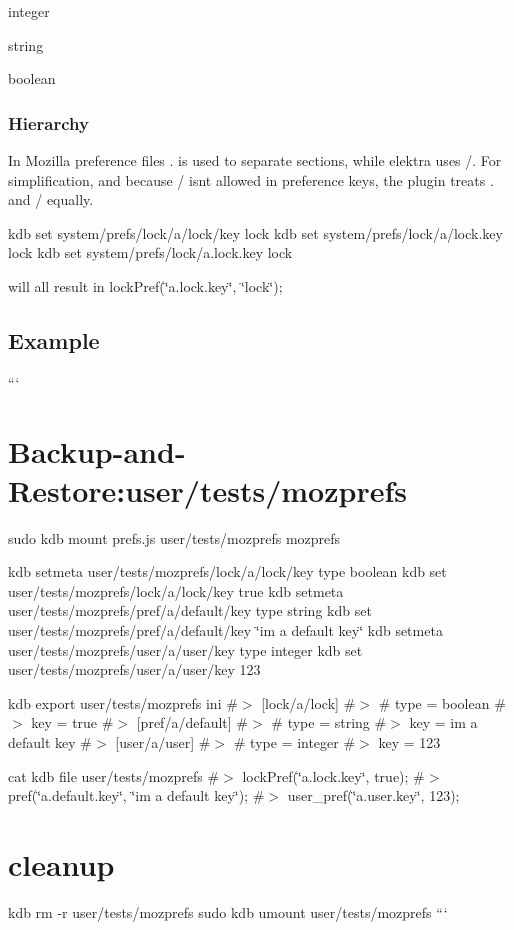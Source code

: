 \begin{DoxyItemize}
\item {\ttfamily integer}
\item {\ttfamily string}
\item {\ttfamily boolean}
\end{DoxyItemize}

\subsubsection*{Hierarchy}

In Mozilla preference files {\ttfamily .} is used to separate sections, while elektra uses {\ttfamily /}. For simplification, and because {\ttfamily /} isn\textquotesingle{}t allowed in preference keys, the plugin treats {\ttfamily .} and {\ttfamily /} equally. \begin{DoxyVerb}kdb set system/prefs/lock/a/lock/key lock
kdb set system/prefs/lock/a/lock.key lock
kdb set system/prefs/lock/a.lock.key lock
\end{DoxyVerb}


will all result in {\ttfamily lock\+Pref(\char`\"{}a.\+lock.\+key\char`\"{}, \char`\"{}lock\char`\"{});}

\subsection*{Example}

``` \section*{Backup-\/and-\/\+Restore\+:user/tests/mozprefs}

sudo kdb mount prefs.\+js user/tests/mozprefs mozprefs

kdb setmeta user/tests/mozprefs/lock/a/lock/key type boolean kdb set user/tests/mozprefs/lock/a/lock/key true kdb setmeta user/tests/mozprefs/pref/a/default/key type string kdb set user/tests/mozprefs/pref/a/default/key \char`\"{}i\textquotesingle{}m a default key\char`\"{} kdb setmeta user/tests/mozprefs/user/a/user/key type integer kdb set user/tests/mozprefs/user/a/user/key 123

kdb export user/tests/mozprefs ini \#$>$ \mbox{[}lock/a/lock\mbox{]} \#$>$ \# type = boolean \#$>$ key = true \#$>$ \mbox{[}pref/a/default\mbox{]} \#$>$ \# type = string \#$>$ key = i\textquotesingle{}m a default key \#$>$ \mbox{[}user/a/user\mbox{]} \#$>$ \# type = integer \#$>$ key = 123

cat {\ttfamily kdb file user/tests/mozprefs} \#$>$ lock\+Pref(\char`\"{}a.\+lock.\+key\char`\"{}, true); \#$>$ pref(\char`\"{}a.\+default.\+key\char`\"{}, \char`\"{}i\textquotesingle{}m a default key\char`\"{}); \#$>$ user\+\_\+pref(\char`\"{}a.\+user.\+key\char`\"{}, 123);

\section*{cleanup}

kdb rm -\/r user/tests/mozprefs sudo kdb umount user/tests/mozprefs ``` 